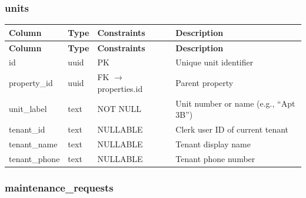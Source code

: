 \documentclass[12pt,a4paper]{article}
\begin{document}
\subsubsection{units}

\begin{longtable}{L{2.5cm} L{2.5cm} L{3.5cm} L{4.5cm}}
\toprule
\textbf{Column} & \textbf{Type} & \textbf{Constraints} & \textbf{Description} \\
\midrule
\endfirsthead
\toprule
\textbf{Column} & \textbf{Type} & \textbf{Constraints} & \textbf{Description} \\
\midrule
\endhead
\bottomrule
\endfoot
id & uuid & PK & Unique unit identifier \\
\midrule
property\_id & uuid & FK $\rightarrow$ properties.id & Parent property \\
\midrule
unit\_label & text & NOT NULL & Unit number or name (e.g., ``Apt 3B'') \\
\midrule
tenant\_id & text & NULLABLE & Clerk user ID of current tenant \\
\midrule
tenant\_name & text & NULLABLE & Tenant display name \\
\midrule
tenant\_phone & text & NULLABLE & Tenant phone number \\
\end{longtable}

\subsubsection{maintenance\_requests}
\end{document}
